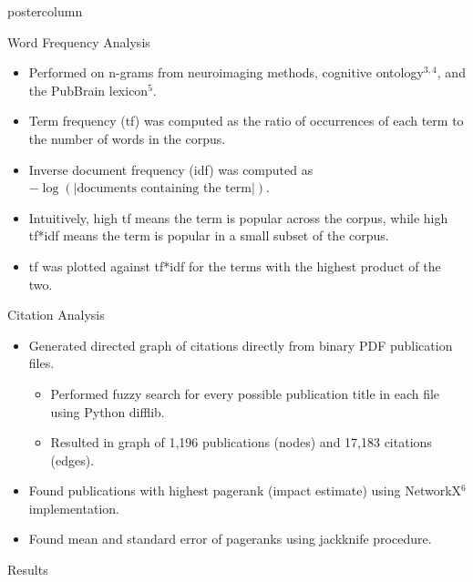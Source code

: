 \documentclass[final,hyperref={pdfpagelabels=false}]{beamer}
\begin{document}
\begin{frame}
\begin{columns}
\begin{column}{.5\textwidth}
\begin{beamercolorbox}[center,wd=\textwidth]{postercolumn}
\begin{minipage}[T]{.96\textwidth}
{            \begin{block}{Word Frequency Analysis}
                \begin{itemize}
                    \item Performed on n-grams from neuroimaging methods, cognitive ontology$^{3,4}$, and the PubBrain lexicon$^5$. 
                    	\item Term frequency (tf) was computed as the ratio of occurrences of each term to the number of words in the corpus. 
			\item Inverse document frequency (idf) was computed as $-\log (| \text{documents containing the term} |)$.
			\item Intuitively, high tf means the term is popular across the corpus, while high tf*idf means the term is popular in a small subset of the corpus.
			\item tf was plotted against tf*idf for the terms with the highest product of the two.
                \end{itemize}
            \end{block}
            \begin{block}{Citation Analysis}
                \begin{itemize}
                    \item Generated directed graph of citations directly from binary PDF publication files.
                    \begin{itemize}
                    	\item Performed fuzzy search for every possible publication title in each file using Python difflib.
				\item Resulted in graph of 1,196 publications (nodes) and 17,183 citations (edges).
                    \end{itemize}
                    \item Found publications with highest pagerank (impact estimate) using NetworkX$^6$ implementation.
                    \item Found mean and standard error of pageranks using jackknife procedure.
            	 \end{itemize}
            \end{block}
            \begin{block}{Results}
                \begin{center}
                \begin{columns}
              \begin{column}{.45\linewidth}
                  \begin{figure}

\end{figure}
\end{column}
\end{columns}
\end{center}
\end{block}}
\end{minipage}
\end{beamercolorbox}
\end{column}
\end{columns}
\end{frame}
\end{document}
